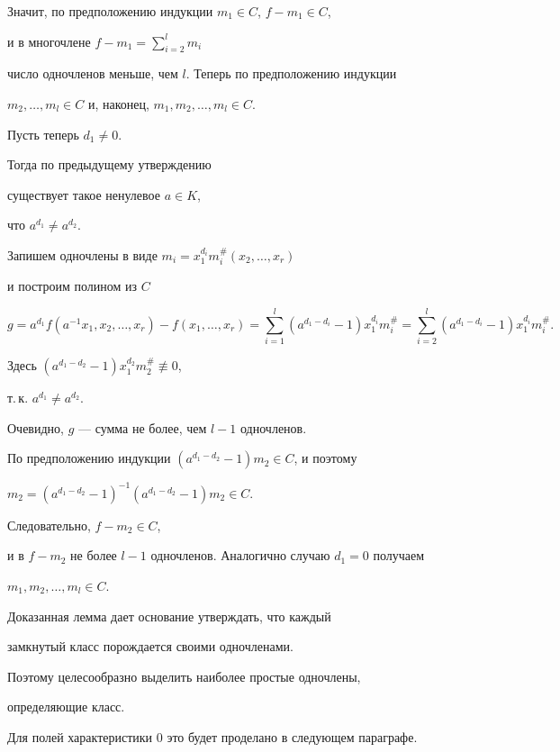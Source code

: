 Значит, по предположению индукции ${m_1}\in C$, $f-{m_1}\in C$,


и в многочлене $f-{m_1}=\sum\limits^l_{i=2} m_i$


число одночленов меньше, чем $l$. Теперь по предположению индукции


${m_2},\dotsc,{m_l}\in C$ и, наконец, ${m_1},{m_2},\dotsc,{m_l}\in C$.





Пусть теперь ${d_1}\ne 0$. 


Тогда по предыдущему утверждению 


существует такое ненулевое $a\in K$, 


что ${a^{d_1}}\ne {a^{d_2}}$.


Запишем одночлены в виде ${m_i}={x_1^{d_i}}{m_i^{\#}}({x_2},\dotsc,{x_r})$


и построим полином из $C$


$$


g=a^{d_1}f(a^{-1}x_1,x_2,\dotsc,x_r)-f(x_1,\dotsc,x_r)=


\sum_{i=1}^l (a^{d_1-d_i}-1){x_1^{d_i}}{m_i^{\#}}


=\sum_{i=2}^l (a^{d_1-d_i}-1){x_1^{d_i}}{m_i^{\#}}.


$$


Здесь $(a^{d_1-d_2}-1){x_1^{d_2}}{m_2^{\#}}\not\equiv 0$,


т.\,к. ${a^{d_1}}\ne {a^{d_2}}$.


Очевидно, $g$ --- сумма не более, чем $l-1$ одночленов. 


По предположению индукции $(a^{d_1-d_2}-1){m_2}\in C$, и поэтому


$m_2={(a^{d_1-d_2}-1)^{-1}}(a^{d_1-d_2}-1){m_2}\in C$.


Следовательно, $f-m_2\in C$,


и в $f-m_2$ не более $l-1$ одночленов. Аналогично случаю ${d_1}=0$ получаем


${m_1},{m_2},\dotsc,{m_l}\in C$.





Доказанная лемма дает основание утверждать, что каждый


замкнутый класс порождается своими одночленами.


Поэтому целесообразно выделить наиболее простые одночлены,


определяющие класс. 


Для полей характеристики $0$ это будет проделано в следующем параграфе. 





